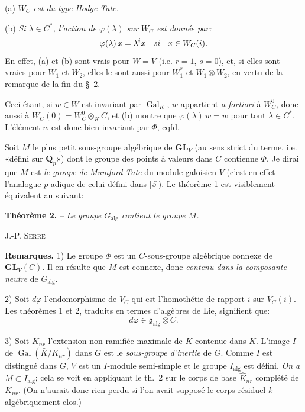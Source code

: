 (a) \textit{$W_C$ est du type Hodge-Tate.}

(b) \textit{Si $\lambda\in C^*$, l’action de $\varphi(\lambda)$ sur $W_C$ est donnée par:}
\[
\varphi(\lambda)\,x=\lambda^ix\quad\text{\itshape si}\quad x\in W_C(i).
\]
En effet, (a) et (b) sont vrais pour $W=V$ (i.e. $r=1$, $s=0$), et, si elles sont vraies pour $W_1$ et $W_2$, elles le sont aussi pour $W_1^*$ et $W_1\otimes W_2$, en vertu de la remarque de la fin du \S~2.

Ceci étant, si $w\in W$ est invariant par $\operatorname{Gal}_K$, $w$ appartient \textit{a fortiori} à $W_C^0$, donc aussi à $W_C(0)=W_C^0\otimes_K C$, et (b) montre que $\varphi(\lambda)\,w=w$ pour tout $\lambda\in C^*$. L’élément $w$ est donc bien invariant par $\varPhi$, cqfd.

Soit $M$ le plus petit sous-groupe algébrique de $\mathbf{GL}_V$ (au sens strict du terme, i.e. «défini sur $\mathbf{Q}_p$») dont le groupe des points à valeurs dans $C$ contienne $\varPhi$. Je dirai que $M$ est \textit{le groupe de Mumford-Tate} du module galoisien $V$ (c’est en effet l’analogue $p$-adique de celui défini dans [\textit{5}]). Le théorème 1 est visiblement équivalent au suivant:

\textbf{Théorème 2.} -- \textit{Le groupe $G_{\mathrm{alg}}$ contient le groupe $M$.}
\begin{center}\small J.-P. \textsc{Serre}\end{center}
\textbf{Remarques.} 1) Le groupe $\varPhi$ est un $C$-sous-groupe algébrique connexe de $\mathbf{GL}_V(C)$. Il en résulte que $M$ est connexe, donc \textit{contenu dans la composante neutre} de $G_{\mathrm{alg}}$.

2) Soit $d\varphi$ l’endomorphisme de $V_C$ qui est l’homothétie de rapport $i$ sur $V_C(i)$. Les théorèmes 1 et 2, traduits en termes d’algèbres de Lie, signifient que:
\[
d\varphi\in\mathfrak{g}_{\mathrm{alg}}\otimes C.
\]

3) Soit $K_{nr}$ l’extension non ramifiée maximale de $K$ contenue dans $\bar K$. L’image $I$ de $\operatorname{Gal}(\bar K/K_{nr})$ dans $G$ est le \textit{sous-groupe d’inertie} de $G$. Comme $I$ est distingué dans $G$, $V$ est un $I$-module semi-simple et le groupe $I_{\mathrm{alg}}$ est défini. \textit{On a $M\subset I_{\mathrm{alg}}$};%
 cela se voit en appliquant le th.~2 sur le corps de base $\hat K_{nr}$ complété de $K_{nr}$. (On n’aurait donc rien perdu si l’on avait supposé le corps résiduel $k$ algébriquement clos.)


